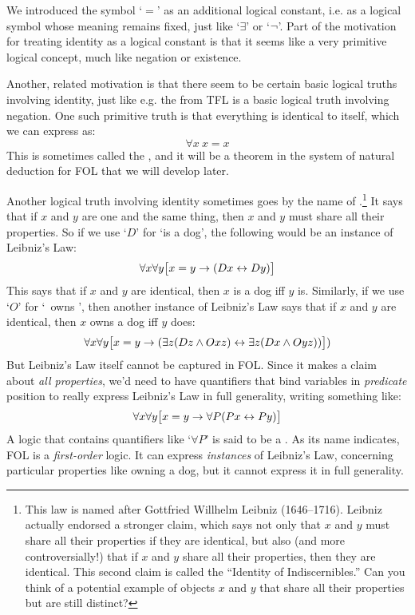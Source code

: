 We introduced the symbol `$=$' as an additional logical constant, i.e. as a logical symbol whose meaning remains fixed, just like `$\exists$' or `$\neg$'.  Part of the motivation for treating identity as a logical constant is that it seems like a very primitive logical concept, much like negation or existence.

Another, related motivation is that there seem to be certain basic logical truths involving identity, just like e.g. the  from TFL  is a basic logical truth involving negation.  One such primitive truth is that everything is identical to itself, which we can express as:
$$\forall x\ x= x$$
This is sometimes called the , and it will be a theorem in the system of natural deduction for FOL that we will develop later.

Another logical truth involving identity sometimes goes by the name of .\footnote{This law is named after Gottfried Willhelm Leibniz (1646--1716).  Leibniz actually endorsed a stronger claim, which says not only that $x$ and $y$ must share all their properties if they are identical, but also (and more controversially!) that if $x$ and $y$ share all their properties, then they are identical.  This second claim is called the ``Identity of Indiscernibles.''  Can you think of a potential example of objects $x$ and $y$ that share all their properties but are still distinct?}  It says that if $x$ and $y$ are one and the same thing, then $x$ and $y$ must share all their properties. So if we use `$D$' for `\blank is a dog', the following would be an instance of Leibniz's Law:
$$\forall x \forall y\bigl[x = y \rightarrow (Dx \leftrightarrow Dy)\bigr]$$
This says that if $x$ and $y$ are identical, then $x$ is a dog iff $y$ is.  Similarly, if we use `$O$' for `\blank\ owns \blank', then another instance of Leibniz's Law says that if $x$ and $y$ are identical, then $x$ owns a dog iff $y$ does:
$$\forall x \forall y\bigl[x = y \rightarrow (\exists z(Dz \wedge Oxz) \leftrightarrow \exists z(Dx \wedge Oyz))\bigr])$$
But Leibniz's Law itself cannot be captured in FOL.  Since it makes a claim about \emph{all properties}, we'd need to have quantifiers that bind variables in \emph{predicate} position to really express Leibniz's Law in full generality, writing something like:
$$\forall x \forall y\bigl[x = y \rightarrow \forall P(Px \leftrightarrow Py)\bigr]$$
A logic that contains quantifiers like `$\forall P$' is said to be a .  As its name indicates, FOL is a \emph{first-order} logic.  It can express  \emph{instances} of Leibniz's Law, concerning particular properties like owning a dog, but it cannot express it in full generality.

